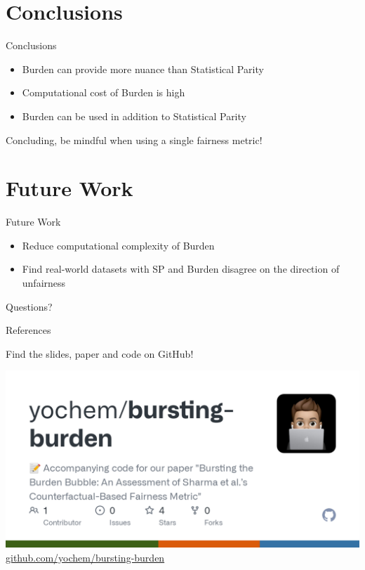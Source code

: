 \documentclass[handout,aspectratio=169]{beamer}
\begin{document}
\section{Conclusions}

\begin{frame}{Conclusions}
    \begin{itemize}
        \item Burden can provide more nuance than Statistical Parity
        \item Computational cost of Burden is high
        \item Burden can be used in addition to Statistical Parity
    \end{itemize}

    \vspace{1cm}
    \begin{center}
    {\large\alert{Concluding, be mindful when using a single fairness metric!}}
    \end{center}
\end{frame}

\section{Future Work}
\begin{frame}{Future Work}
    \begin{itemize}
        \item Reduce computational complexity of Burden
        \item Find real-world datasets with SP and Burden disagree on the direction of unfairness
    \end{itemize} 
\end{frame}

\appendix

\begin{frame}[standout]
  Questions?
\end{frame}

\begin{frame}[allowframebreaks]{References}

  
  

\end{frame}


\begin{frame}{Find the slides, paper and code on GitHub!}

\begin{center}
    \includegraphics[width=.6\textwidth]{img/github.png}
    \vspace{1cm}
    \alert{
    \href{https://github.com/yochem/bursting-burden}{github.com/yochem/bursting-burden}
    }
\end{center}
\end{frame}
\end{document}
